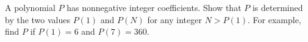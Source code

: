 A polynomial $P$ has nonnegative integer coefficients. Show that $P$ is determined by the two values $P(1)$ and $P(N)$ for any integer $N>P(1)$. For example, find $P$ if $P(1)=6$ and $P(7)=360$.
